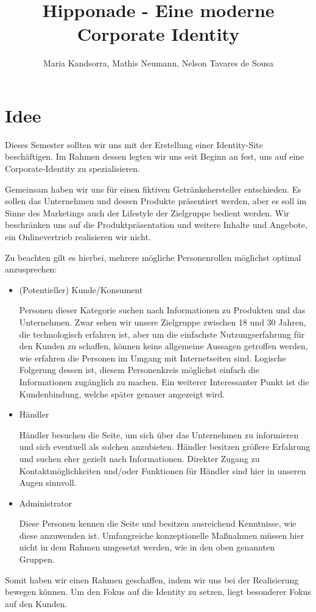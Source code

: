 \documentclass[12pt,a4paper,oneside,ngerman]{article}
\begin{document}
\title{Hipponade - Eine moderne Corporate Identity} %
\author{Maria Kandsorra, Mathis Neumann, Nelson Tavares de Sousa}
\maketitle
\newpage

\tableofcontents

%
%
%
%

\newpage

\section{Idee} %
Dieses Semester sollten wir uns mit der Erstellung einer Identity-Site beschäftigen.
Im Rahmen dessen legten wir uns seit Beginn an fest, uns auf eine Corporate-Identity zu spezialisieren.

Gemeinsam haben wir uns für einen fiktiven Getränkehersteller entschieden. Es sollen das Unternehmen und dessen Produkte präsentiert werden, aber es soll im Sinne des Marketings auch der Lifestyle der Zielgruppe bedient werden. 
Wir beschränken uns auf die Produktpräsentation und weitere Inhalte und Angebote, ein Onlinevertrieb realisieren wir nicht.

 Zu beachten gilt es hierbei, mehrere mögliche Personenrollen möglichst optimal anzusprechen:
\begin{itemize}
\item (Potentieller) Kunde/Konsument

Personen dieser Kategorie suchen nach Informationen zu Produkten und das Unternehmen. 
Zwar sehen wir unsere Zielgruppe zwischen 18 und 30 Jahren, die technologisch erfahren ist, aber um die einfachste Nutzungserfahrung für den Kunden zu schaffen, können keine allgemeine Aussagen getroffen werden, wie erfahren die Personen im Umgang mit Internetseiten sind. 
Logische Folgerung dessen ist, diesem Personenkreis möglichst einfach die Informationen zugänglich zu machen. Ein weiterer Interessanter Punkt ist die Kundenbindung, welche später genauer angezeigt wird.

\item Händler

Händler besuchen die Seite, um sich über das Unternehmen zu informieren und sich eventuell als solchen anzubieten. Händler besitzen größere Erfahrung und suchen eher gezielt nach Informationen. Direkter Zugang zu Kontaktmöglichkeiten und/oder Funktionen für Händler sind hier in unseren Augen sinnvoll.

\item Administrator

Diese Personen kennen die Seite und besitzen ausreichend Kenntnisse, wie diese anzuwenden ist.
Umfangreiche konzeptionelle Maßnahmen müssen hier nicht in dem Rahmen umgesetzt werden, wie in den oben genannten Gruppen.

\end{itemize}
Somit haben wir einen Rahmen geschaffen, indem wir uns bei der Realisierung bewegen können. Um den Fokus auf die Identity zu setzen, liegt besonderer Fokus auf den Kunden.
\end{document}

